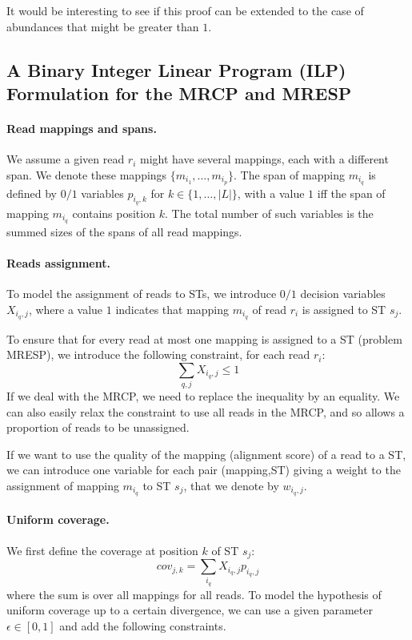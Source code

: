 \documentclass[10pt]{llncs}
\begin{document}
\begin{remark}
    \label{rem:RCPhardness}
    It would be interesting to see if this proof can be extended to the case of abundances that might be greater than $1$.
\end{remark}

\subsection{A Binary Integer Linear Program (ILP) Formulation for the MRCP and MRESP}
\label{ssec:ILP1}

\paragraph{Read mappings and spans.}
We assume a given read $r_i$ might have several mappings, each with a different span. We denote these mappings $\{m_{i_1},\dots,m_{i_p}\}$. The span of mapping $m_{i_q}$ is defined by $0/1$ variables $p_{i_q,k}$ for $k\in \{1,\dots,|L|\}$, with a value $1$ iff the span of mapping $m_{i_q}$ contains position $k$. The total number of such variables is the summed sizes of the spans of all read mappings.

\paragraph{Reads assignment.} To model the assignment of reads to STs, we introduce $0/1$ decision variables $X_{i_q,j}$, where a value $1$ indicates that mapping $m_{i_q}$ of read $r_i$ is assigned to ST $s_j$.

To ensure that for every read at most one mapping is assigned to a ST (problem MRESP), we introduce the following constraint, for each read $r_i$:
\begin{equation}
    \label{eq:one_mapping_per_read}
    \sum_{q,j} X_{i_q,j} \leq 1
\end{equation}
If we deal with the MRCP, we need to replace the inequality by an equality. We can also easily relax the constraint to use all reads in the MRCP, and so allows a proportion of reads to be unassigned.

If we want to use the quality of the mapping (alignment score) of a read to a ST, we can introduce one variable for each pair (mapping,ST) giving a weight to the assignment of mapping $m_{i_q}$ to ST $s_j$, that we denote by $w_{i_q,j}$. 

\paragraph{Uniform coverage.} We first define the coverage at position $k$ of ST $s_j$:
$$cov_{j,k} = \sum_{i_q} X_{i_q,j} p_{i_q,j}$$
where the sum is over all mappings for all reads. To model the hypothesis of uniform coverage up to a certain divergence, we can use a given parameter $\epsilon \in [0,1]$ and add the following constraints.
\end{document}

